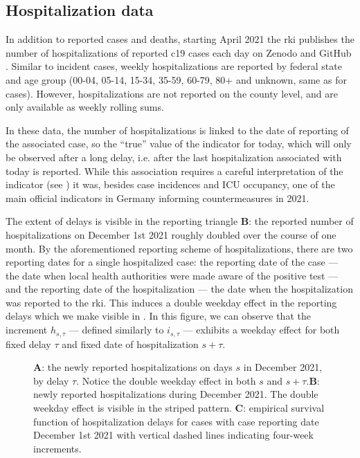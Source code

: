 \subsection{Hospitalization data}
\label{subsec:hospitalization_data}
In addition to reported cases and deaths, starting  April 2021 the \acrshort{rki} publishes the number of hospitalizations of reported \acrshort{c19} cases each day on Zenodo \citep{RobertKoch-Institut2024COVID19Hospitalisierungen} and GitHub \citep{RobertKoch-Institut2024COVID19Hospitalisierungena}. 
Similar to incident cases, weekly hospitalizations are reported by federal state and age group (00-04, 05-14, 15-34, 35-59, 60-79, 80+ and unknown, same as for cases). However, hospitalizations are not reported on the county level, and are only available as weekly rolling sums.

In these data, the number of hospitalizations is linked to the date of reporting of the associated case, so the ``true'' value of the indicator for today, which will only be observed after a long delay, i.e. after the last hospitalization associated with today is reported. While this association requires a careful interpretation of the indicator (see ) it was, besides case incidences and ICU occupancy, one of the main official indicators in Germany informing countermeasures in 2021.

The extent of delays is visible in the reporting triangle  \textbf{B}: the reported number of hospitalizations on December 1st 2021 roughly doubled over the course of one month. By the aforementioned reporting scheme of hospitalizations, there are two reporting dates for a single hospitalized case: the reporting date of the case --- the date when local health authorities were made aware of the positive test --- and the reporting date of the hospitalization --- the date when the hospitalization was reported to the \acrshort{rki}. This induces a double weekday effect in the reporting delays which we make visible in . 
In this figure, we can observe that the increment $h_{s,\tau}$ --- defined similarly to $i_{s,\tau}$ --- exhibits a weekday effect for both fixed delay $\tau$ and fixed date of hospitalization
$s + \tau$. 

\begin{figure}
    \resizebox{\textwidth}{!}{%
    }
    \caption{\textbf{A}: the newly reported hospitalizations on days $s$ in December 2021, by delay $\tau$. Notice the double weekday effect in both $s$ and $s+\tau$.\textbf{B}: newly reported hospitalizations during December 2021. The double weekday effect is visible in the striped pattern. \textbf{C}: empirical survival function of hospitalization delays for cases with case reporting date December 1st 2021 with vertical dashed lines indicating four-week increments.}
    \label{fig:double_weekday_effect_hosp}
\end{figure}

